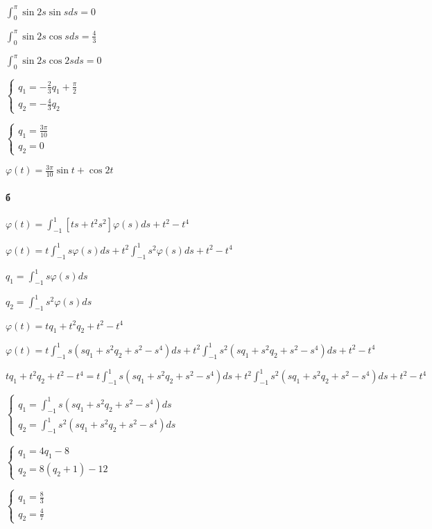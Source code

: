\documentclass[russian]{article}
\begin{document}
$\int _0^\pi \sin 2s \sin s ds = 0 $

$\int _0^\pi \sin 2s \cos s ds = \frac{4}{3} $

$\int _0^\pi \sin 2s \cos 2s ds = 0$

$\begin{cases}
q_1 = - \frac{2}{3} q_1 + \frac{\pi}{2}\\
q_2 =  - \frac{4}{3} q_2 
\end{cases}$

$\begin{cases}
q_1 = \frac{3\pi}{10}\\
q_2 = 0
\end{cases}$

$\varphi(t) = \frac{3\pi}{10} \sin t + \cos 2t$

\paragraph*{б}

$\varphi(t) = \int_{-1}^1 [t s + t^2 s^2] \varphi(s) ds + t^2 - t^4$

$\varphi(t) = t \int_{-1}^1 s \varphi(s) ds + t^2 \int_{-1}^1 s^2 \varphi(s) ds + t^2 - t^4$

$q_1 = \int_{-1}^1 s \varphi(s) ds$

$q_2 = \int_{-1}^1 s^2 \varphi(s) ds$

$\varphi(t) = t q_1 + t^2 q_2 + t^2 - t^4$

$\varphi(t) = t \int_{-1}^1 s (s q_1 + s^2 q_2 + s^2 - s^4) ds + t^2 \int_{-1}^1 s^2 (s q_1 + s^2 q_2 + s^2 - s^4) ds + t^2 - t^4$

$t q_1 + t^2 q_2 + t^2 - t^4 = t \int_{-1}^1 s (s q_1 + s^2 q_2 + s^2 - s^4) ds + t^2 \int_{-1}^1 s^2 (s q_1 + s^2 q_2 + s^2 - s^4) ds + t^2 - t^4$

$\begin{cases}
q_1 = \int_{-1}^1 s (s q_1 + s^2 q_2 + s^2 - s^4) ds \\
q_2 = \int_{-1}^1 s^2 (s q_1 + s^2 q_2 + s^2 - s^4) ds
\end{cases}$

$\begin{cases}
q_1 = 4 q_1 - 8 \\
q_2 = 8 (q_2+1) - 12
\end{cases}$

$\begin{cases}
q_1 = \frac{8}{3} \\
q_2 = \frac{4}{7}
\end{cases}$
\end{document}
